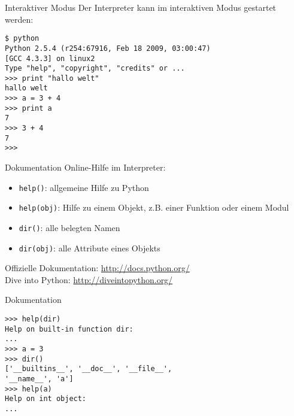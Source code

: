 \begin{frame}[fragile]{Interaktiver Modus}
Der Interpreter kann im interaktiven Modus gestartet werden:
\begin{lstlisting}[style=Shell]
$ python
Python 2.5.4 (r254:67916, Feb 18 2009, 03:00:47) 
[GCC 4.3.3] on linux2
Type "help", "copyright", "credits" or ...
>>> print "hallo welt"
hallo welt
>>> a = 3 + 4
>>> print a
7
>>> 3 + 4
7
>>>
\end{lstlisting} %
\end{frame}

\begin{frame}{Dokumentation}
Online-Hilfe im Interpreter:
\begin{itemize}
\item \alert{\lstinline{help()}}: allgemeine Hilfe zu Python
\item \alert{\lstinline{help(obj)}}: Hilfe zu einem Objekt, z.B. einer Funktion oder einem Modul
\item \alert{\lstinline{dir()}}: alle belegten Namen 
\item \alert{\lstinline{dir(obj)}}: alle Attribute eines Objekts
\end{itemize}
\vspace{5mm}
Offizielle Dokumentation: \href{http://docs.python.org/}{http://docs.python.org/}\\
\vspace{5mm}
Dive into Python: \href{http://diveintopython.org/}{http://diveintopython.org/}

\end{frame}

\begin{frame}[fragile]{Dokumentation}
\begin{lstlisting}[style=Shell]
>>> help(dir)
Help on built-in function dir:
...
>>> a = 3
>>> dir()
['__builtins__', '__doc__', '__file__', 
'__name__', 'a']
>>> help(a)
Help on int object:
...
\end{lstlisting}
\end{frame}

